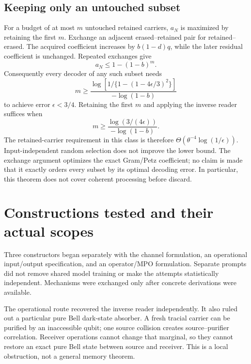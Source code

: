 \documentclass[11pt,a4paper]{article}
\begin{document}
\subsection{Keeping only an untouched subset}
For a budget of at most $m$ untouched retained carriers, $a_N$ is maximized by retaining the first $m$. Exchange an adjacent erased--retained pair for retained--erased. The acquired coefficient increases by $b(1-d)q$, while the later residual coefficient is unchanged. Repeated exchanges give
\[
 a_N\le1-(1-b)^m.
\]
Consequently every decoder of any such subset needs
\begin{equation}
 m\ge\frac{\log\!\left[1/\{1-(1-4\epsilon/3)^2\}\right]}{-\log(1-b)}
\end{equation}
to achieve error $\epsilon<3/4$. Retaining the first $m$ and applying the inverse reader suffices when
\begin{equation}
 m\ge\frac{\log(3/(4\epsilon))}{-\log(1-b)}.
\end{equation}
The retained-carrier requirement in this class is therefore $\Theta(\theta^{-4}\log(1/\epsilon))$. Input-independent random selection does not improve the lower bound. The exchange argument optimizes the exact Gram/Petz coefficient; no claim is made that it exactly orders every subset by its optimal decoding error. In particular, this theorem does not cover coherent processing before discard.

\section{Constructions tested and their actual scopes}
Three constructors began separately with the channel formulation, an operational input/output specification, and an operator/MPO formulation. Separate prompts did not remove shared model training or make the attempts statistically independent. Mechanisms were exchanged only after concrete derivations were available.

The operational route recovered the inverse reader independently. It also ruled out a particular pure Bell dark-state absorber. A fresh tracial carrier can be purified by an inaccessible qubit; one source collision creates source--purifier correlation. Receiver operations cannot change that marginal, so they cannot restore an exact pure Bell state between source and receiver. This is a local obstruction, not a general memory theorem.
\end{document}
